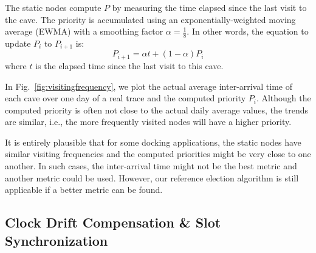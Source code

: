 \documentclass[twoside,twocolumn]{article}
\begin{document}
The static nodes compute $P$ by measuring the time elapsed since the
last visit to the cave. The priority is accumulated using an
exponentially-weighted moving average (EWMA) with a smoothing factor
$\alpha = \frac{1}{8}$.  In other words, the equation to update $P_i$
to $P_{i+1}$ is:
\begin{equation}\label{eq1}
	P_{i+1} = \alpha t + (1 - \alpha) P_i
\end{equation}
where $t$ is the elapsed time since the last visit to this cave.

In Fig.~\ref{fig:visitingfrequency}, we plot the actual average
inter-arrival time of each cave over one day of a real trace and the
computed priority $P_i$.  Although the computed priority is often not
close to the actual daily average values, the trends are similar,
i.e., the more frequently visited nodes will have a higher priority.

It is entirely plausible that for some docking applications, the
static nodes have similar visiting frequencies and the computed
priorities might be very close to one another. In such cases, the
inter-arrival time might not be the best metric and another metric
could be used. However, our reference election algorithm is still
applicable if a better metric can be found.

\subsection{Clock Drift Compensation \& Slot Synchronization}
\label{sec:clock-drift}
\end{document}

